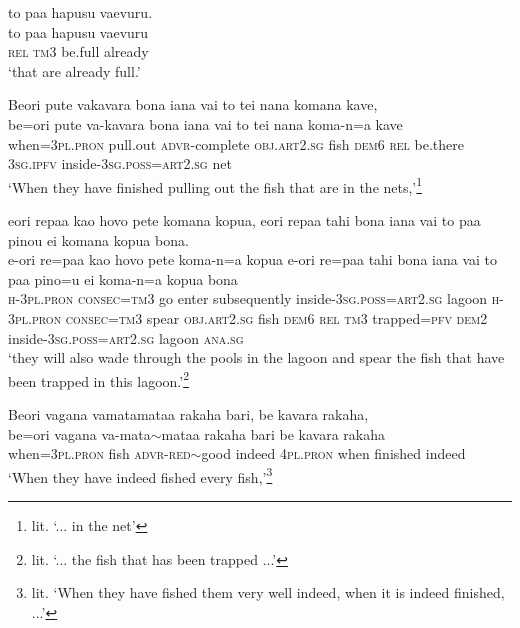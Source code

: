 \ea\label{ex:text25-13}
to paa hapusu vaevuru.\\
\gll to	paa	hapusu	vaevuru\\
     \textsc{rel}	\textsc{tm}3	be.full	already\\
\glt `that are already full.'
\z

\newpage
\ea\label{ex:text25-14}
Beori pute vakavara bona iana vai to tei nana komana kave,\\
\gll be=ori	pute	va-kavara	bona	iana	vai	to	tei	nana	koma-n=a	kave\\
     when=3\textsc{pl}.\textsc{pron}	pull.out	\textsc{advr}-complete	\textsc{obj}.\textsc{art}2.\textsc{sg}	fish	\textsc{dem}6	\textsc{rel}	be.there	3\textsc{sg}.\textsc{ipfv}	inside-3\textsc{sg}.\textsc{poss}=\textsc{art}2.\textsc{sg}	net\\
\glt `When they have finished pulling out the fish that are in the nets,'\footnote{lit. `... in the net'}
\z

\ea\label{ex:text25-15}
eori repaa kao hovo pete komana kopua, eori repaa tahi bona iana vai to paa pinou ei komana kopua bona.\\
\gll e-ori	re=paa	kao	hovo	pete	koma-n=a	kopua	e-ori	re=paa	tahi	bona	iana	vai	to	paa	pino=u	ei	koma-n=a	kopua	bona\\
     \textsc{h}-3\textsc{pl}.\textsc{pron}	\textsc{consec}=\textsc{tm}3	go	enter	subsequently	inside-3\textsc{sg}.\textsc{poss}=\textsc{art}2.\textsc{sg}	lagoon	\textsc{h}-3\textsc{pl}.\textsc{pron}	\textsc{consec}=\textsc{tm}3	spear	\textsc{obj}.\textsc{art}2.\textsc{sg}	fish	\textsc{dem}6	\textsc{rel}	\textsc{tm}3	trapped=\textsc{pfv}	\textsc{dem}2	inside-3\textsc{sg}.\textsc{poss}=\textsc{art}2.\textsc{sg}	lagoon	\textsc{ana}.\textsc{sg}\\
\glt `they will also wade through the pools in the lagoon and spear the fish that have been trapped in this lagoon.'\footnote{lit. `... the fish that has been trapped ...'}
\z

\ea\label{ex:text25-16}
Beori vagana vamatamataa rakaha bari, be kavara rakaha,\\
\gll be=ori	vagana	va-mata{$\sim$}mataa	rakaha	bari	be	kavara	rakaha\\
     when=3\textsc{pl}.\textsc{pron}	fish	\textsc{advr}-\textsc{red}{$\sim$}good	indeed	4\textsc{pl}.\textsc{pron}	when	finished	indeed\\
\glt `When they have indeed fished every fish,'\footnote{lit. `When they have fished them very well indeed, when it is indeed finished, ...'}
\z

